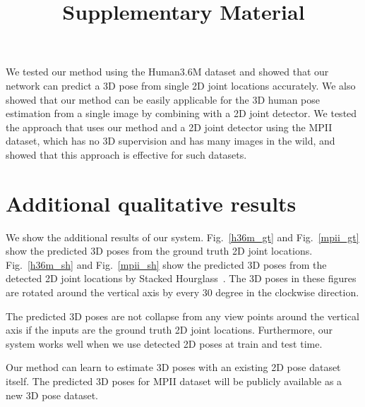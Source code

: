 \documentclass[runningheads]{llncs}
\newcommand{\Fref}[1]{Fig.~\ref{#1}}
\begin{document}
We tested our method using the Human3.6M dataset and showed that our network can predict a 3D pose from single 2D joint locations accurately.
We also showed that our method can be easily applicable for the 3D human pose estimation from a single image by combining with a 2D joint detector.
We tested the approach that uses our method and a 2D joint detector using the MPII dataset, which has no 3D supervision and has many images in the wild, and showed that this approach is effective for such datasets.





\title{Supplementary Material} %



\author{\empty}
\institute{\empty}


\maketitle

\section{Additional qualitative results}
We show the additional results of our system.
\Fref{h36m_gt} and \Fref{mpii_gt} show the predicted 3D poses from the ground truth 2D joint locations.
\Fref{h36m_sh} and \Fref{mpii_sh} show the predicted 3D poses from the detected 2D joint locations by Stacked Hourglass~\cite{S_newell}.
The 3D poses in these figures are rotated around the vertical axis by every 30 degree in the clockwise direction.

The predicted 3D poses are not collapse from any view points around the vertical axis if the inputs are the ground truth 2D joint locations.
Furthermore, our system works well when we use detected 2D poses at train and test time.

Our method can learn to estimate 3D poses with an existing 2D pose dataset itself.
The predicted 3D poses for MPII dataset will be publicly available as a new 3D pose dataset.
\end{document}

